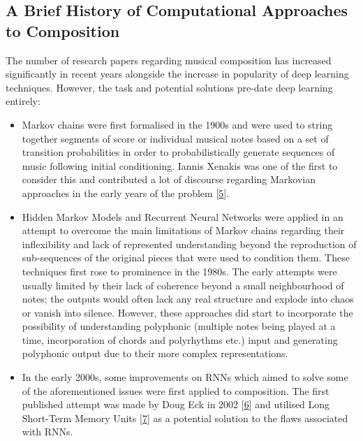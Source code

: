 \documentclass[12pt,]{article}
\providecommand{\tightlist}{%
  \setlength{\itemsep}{0pt}\setlength{\parskip}{0pt}}
\begin{document}
\hypertarget{a-brief-history-of-computational-approaches-to-composition}{%
\subsection{A Brief History of Computational Approaches to
Composition}\label{a-brief-history-of-computational-approaches-to-composition}}

The number of research papers regarding musical composition has
increased significantly in recent years alongside the increase in
popularity of deep learning techniques. However, the task and potential
solutions pre-date deep learning entirely:

\begin{itemize}
\tightlist
\item
  Markov chains were first formalised in the 1900s and were used to
  string together segments of score or individual musical notes based on
  a set of transition probabilities in order to probabilistically
  generate sequences of music following initial conditioning. Iannis
  Xenakis was one of the first to consider this and contributed a lot of
  discourse regarding Markovian approaches in the early years of the
  problem {[}\protect\hyperlink{ref-luque2009stochastic}{5}{]}.
\item
  Hidden Markov Models and Recurrent Neural Networks were applied in an
  attempt to overcome the main limitations of Markov chains regarding
  their inflexibility and lack of represented understanding beyond the
  reproduction of sub-sequences of the original pieces that were used to
  condition them. These techniques first rose to prominence in the
  1980s. The early attempts were usually limited by their lack of
  coherence beyond a small neighbourhood of notes; the outputs would
  often lack any real structure and explode into chaos or vanish into
  silence. However, these approaches did start to incorporate the
  possibility of understanding polyphonic (multiple notes being played
  at a time, incorporation of chords and polyrhythms etc.) input and
  generating polyphonic output due to their more complex
  representations.
\item
  In the early 2000s, some improvements on RNNs which aimed to solve
  some of the aforementioned issues were first applied to composition.
  The first published attempt was made by Doug Eck in 2002
  {[}\protect\hyperlink{ref-eck2002finding}{6}{]} and utilised Long
  Short-Term Memory Units
  {[}\protect\hyperlink{ref-gers1999learning}{7}{]} as a potential
  solution to the flaws associated with RNNs.

\end{itemize}
\end{document}
